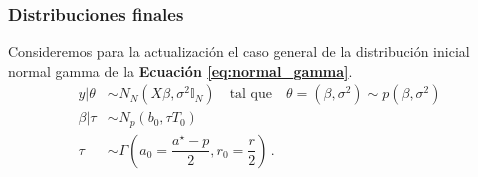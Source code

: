 \subsubsection*{Distribuciones finales}

Consideremos para la actualización el caso general de la distribución inicial normal gamma de la \textbf{Ecuación \ref{eq:normal_gamma}}. 
\begin{align} \label{eq:modelo_normal_pre_bayes}
y|\theta &\sim N_N(X\beta,\sigma^2\mathbb{I}_N) \quad \text{tal que} \quad \theta = (\beta, \sigma^2) \sim p(\beta,\sigma^2) \nonumber \\
\beta|\tau &\sim N_p(b_0,\tau T_0) \nonumber \\ 
\tau &\sim \Gamma\left(a_0 = \dfrac{a^\star-p}{2},r_0 = \dfrac{r}{2}\right) \,.
\end{align}

